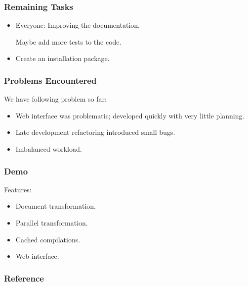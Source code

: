 \documentclass{beamer}
\begin{document}
\begin{frame}
  \frametitle{Remaining Tasks}
  \begin{itemize}
    \item Everyone: Improving the documentation. 
    \item [Maybe] add more tests to the code.
    \item Create an installation package.
  \end{itemize}
\end{frame}

\begin{frame}
  \frametitle{Problems Encountered}
  We have following problem so far:
  \begin{itemize}
    \item Web interface was problematic; developed quickly with very little planning.
    \item Late development refactoring introduced small bugs.
    \item Imbalanced workload.
  \end{itemize}
\end{frame}


\begin{frame}
  \frametitle{Demo}
  Features:
  \begin{itemize}
    \item Document transformation.
    \item Parallel transformation.
    \item Cached compilations.
    \item Web interface.
  \end{itemize} 
\end{frame}

\begin{frame}
  \frametitle{Reference}
    \printbibliography
\end{frame}
\end{document}
